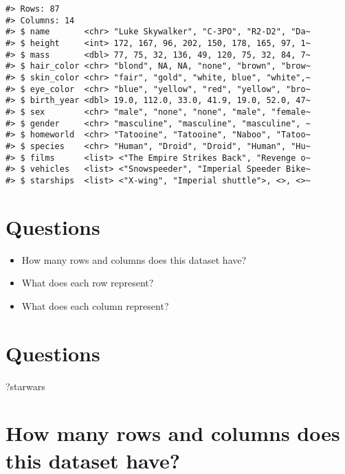\documentclass[
]{book}
\newenvironment{Shaded}{\begin{snugshade}}{\end{snugshade}}
\newcommand{\NormalTok}[1]{#1}
\providecommand{\tightlist}{%
  \setlength{\itemsep}{0pt}\setlength{\parskip}{0pt}}
\theoremstyle{definition}
\theoremstyle{definition}
\theoremstyle{definition}
\theoremstyle{definition}
\theoremstyle{remark}
\begin{document}
\begin{verbatim}
#> Rows: 87
#> Columns: 14
#> $ name       <chr> "Luke Skywalker", "C-3PO", "R2-D2", "Da~
#> $ height     <int> 172, 167, 96, 202, 150, 178, 165, 97, 1~
#> $ mass       <dbl> 77, 75, 32, 136, 49, 120, 75, 32, 84, 7~
#> $ hair_color <chr> "blond", NA, NA, "none", "brown", "brow~
#> $ skin_color <chr> "fair", "gold", "white, blue", "white",~
#> $ eye_color  <chr> "blue", "yellow", "red", "yellow", "bro~
#> $ birth_year <dbl> 19.0, 112.0, 33.0, 41.9, 19.0, 52.0, 47~
#> $ sex        <chr> "male", "none", "none", "male", "female~
#> $ gender     <chr> "masculine", "masculine", "masculine", ~
#> $ homeworld  <chr> "Tatooine", "Tatooine", "Naboo", "Tatoo~
#> $ species    <chr> "Human", "Droid", "Droid", "Human", "Hu~
#> $ films      <list> <"The Empire Strikes Back", "Revenge o~
#> $ vehicles   <list> <"Snowspeeder", "Imperial Speeder Bike~
#> $ starships  <list> <"X-wing", "Imperial shuttle">, <>, <>~
\end{verbatim}

\hypertarget{questions}{%
\section{Questions}\label{questions}}

\begin{itemize}
\tightlist
\item
  How many rows and columns does this dataset have?
\item
  What does each row represent?
\item
  What does each column represent?
\end{itemize}

\hypertarget{questions-1}{%
\section{Questions}\label{questions-1}}

\begin{Shaded}
\begin{Highlighting}[]
\NormalTok{?starwars}
\end{Highlighting}
\end{Shaded}

\hypertarget{how-many-rows-and-columns-does-this-dataset-have}{%
\section{How many rows and columns does this dataset have?}\label{how-many-rows-and-columns-does-this-dataset-have}}
\end{document}
